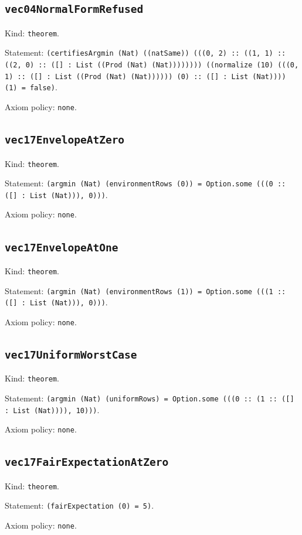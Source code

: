 \documentclass[11pt]{article}
\begin{document}
\subsection*{\texttt{vec04NormalFormRefused}}
\noindent Kind: \texttt{theorem}.\par
\noindent Statement: \texttt{(certifiesArgmin (Nat) ((natSame)) (((0, 2) :: ((1, 1) :: ((2, 0) :: ([] : List ((Prod (Nat) (Nat)))))))) ((normalize (10) (((0, 1) :: ([] : List ((Prod (Nat) (Nat)))))) (0) :: ([] : List (Nat)))) (1) = false)}.\par
\noindent Axiom policy: \texttt{none}.\par
\subsection*{\texttt{vec17EnvelopeAtZero}}
\noindent Kind: \texttt{theorem}.\par
\noindent Statement: \texttt{(argmin (Nat) (environmentRows (0)) = Option.some (((0 :: ([] : List (Nat))), 0)))}.\par
\noindent Axiom policy: \texttt{none}.\par
\subsection*{\texttt{vec17EnvelopeAtOne}}
\noindent Kind: \texttt{theorem}.\par
\noindent Statement: \texttt{(argmin (Nat) (environmentRows (1)) = Option.some (((1 :: ([] : List (Nat))), 0)))}.\par
\noindent Axiom policy: \texttt{none}.\par
\subsection*{\texttt{vec17UniformWorstCase}}
\noindent Kind: \texttt{theorem}.\par
\noindent Statement: \texttt{(argmin (Nat) (uniformRows) = Option.some (((0 :: (1 :: ([] : List (Nat)))), 10)))}.\par
\noindent Axiom policy: \texttt{none}.\par
\subsection*{\texttt{vec17FairExpectationAtZero}}
\noindent Kind: \texttt{theorem}.\par
\noindent Statement: \texttt{(fairExpectation (0) = 5)}.\par
\noindent Axiom policy: \texttt{none}.\par
\end{document}

